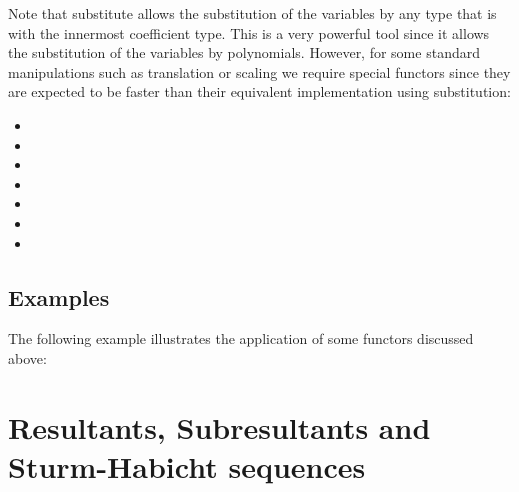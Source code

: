 Note that substitute allows the substitution of the variables by any type that 
is  with the innermost coefficient type. 
This is a very powerful tool since it allows the substitution of the variables 
by polynomials. However, for some standard manipulations such as translation 
or scaling we require special functors since they are expected to be faster 
than their equivalent implementation using substitution:

\begin{itemize}
\item {}\ccGlue
\item {}\ccGlue
\item {}\ccGlue
\item {}\ccGlue
\item {}\ccGlue
\item {}\ccGlue
\item {}
\end{itemize}

\subsection{Examples}   
The following example illustrates the application of some functors 
discussed above:

\section{Resultants, Subresultants and Sturm-Habicht sequences}

